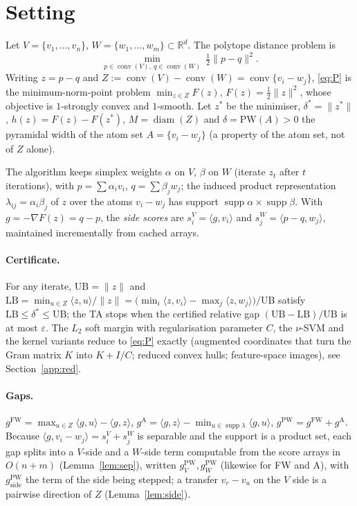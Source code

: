 \documentclass[pdflatex,sn-apa]{sn-jnl}%
\theoremstyle{thmstyleone}
\theoremstyle{thmstyletwo}
\newcommand{\conv}{\operatorname{conv}}
\newcommand{\PW}{\mathrm{PW}}
\newcommand{\ip}[2]{\langle #1, #2 \rangle}
\newcommand{\norm}[1]{\lVert #1 \rVert}
\newcommand{\R}{\mathbb{R}}
\newcommand{\gFW}{g^{\mathrm{FW}}}
\newcommand{\gA}{g^{\mathrm{A}}}
\newcommand{\gPW}{g^{\mathrm{PW}}}
\newcommand{\UB}{\mathrm{UB}}
\newcommand{\LB}{\mathrm{LB}}
\begin{document}
\section{Setting}\label{sec:setting}

Let $V=\{v_1,\dots,v_n\}$, $W=\{w_1,\dots,w_m\}\subset\R^d$. The
polytope distance problem is
\begin{equation}\label{eq:P}
  \min_{p\in\conv(V),\ q\in\conv(W)} \ \tfrac12\norm{p-q}^2 .
\end{equation}
Writing $z=p-q$ and $Z:=\conv(V)-\conv(W)=\conv\{v_i-w_j\}$,
\eqref{eq:P} is the minimum-norm-point problem $\min_{z\in Z}F(z)$,
$F(z)=\tfrac12\norm z^2$, whose objective is $1$-strongly convex and
$1$-smooth. Let $z^*$ be the minimiser, $\delta^*=\norm{z^*}$,
$h(z)=F(z)-F(z^*)$, $M=\operatorname{diam}(Z)$ and
$\delta=\PW(A)>0$ the pyramidal width \citep{lj2015} of the atom set
$A=\{v_i-w_j\}$ (a property of the atom set, not of $Z$ alone).

The algorithm keeps simplex weights $\alpha$ on $V$, $\beta$ on $W$
(iterate $z_t$ after $t$ iterations),
with $p=\sum\alpha_iv_i$, $q=\sum\beta_jw_j$; the induced product
representation $\lambda_{ij}=\alpha_i\beta_j$ of $z$ over the atoms
$v_i-w_j$ has support $\operatorname{supp}\alpha\times\operatorname{supp}\beta$.
With $g=-\nabla F(z)=q-p$, the \emph{side scores} are
$s^V_i=\ip{g}{v_i}$ and $s^W_j=\ip{p-q}{w_j}$, maintained incrementally
from cached arrays.

\paragraph{Certificate.} For any iterate, $\UB=\norm z$ and
$\LB=\min_{u\in Z}\ip{z}{u}/\norm z=\big(\min_i\ip{z}{v_i}-\max_j\ip{z}{w_j}\big)/\UB$
satisfy $\LB\le\delta^*\le\UB$; the TA stops when the certified
relative gap $(\UB-\LB)/\UB$ is at most $\varepsilon$. The $L_2$ soft margin with regularisation
parameter $C$, the $\nu$-SVM and the kernel variants reduce to
\eqref{eq:P} exactly (augmented coordinates that turn the Gram matrix
$K$ into $K+I/C$; reduced convex hulls; feature-space images), see
Section~\ref{app:red}.

\paragraph{Gaps.} $\gFW=\max_{u\in Z}\ip{g}{u}-\ip{g}{z}$,
$\gA=\ip{g}{z}-\min_{u\in\operatorname{supp}\lambda}\ip{g}{u}$,
$\gPW=\gFW+\gA$. Because $\ip{g}{v_i-w_j}=s^V_i+s^W_j$ is separable and
the support is a product set, each gap splits into a $V$-side and a
$W$-side term computable from the score arrays in $O(n+m)$
(Lemma~\ref{lem:sep}), written $\gPW_V,\gPW_W$ (likewise for FW and A),
with $\gPW_{\text{side}}$ the term of the side being stepped; a transfer
$v_r-v_u$ on the $V$ side is a pairwise direction of $Z$
(Lemma~\ref{lem:side}).
\end{document}
